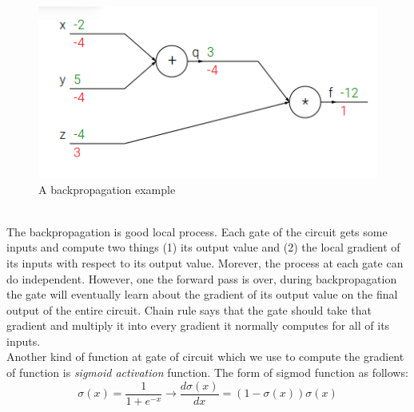 \begin{figure}[h]
	\centering
	\includegraphics[scale=0.6]{images/back_ex}
	\caption{A backpropagation example}
	\label{figbackex}
\end{figure}~\\[0.2cm]
The backpropagation is good local process. Each gate of the circuit gets some inputs and compute two things (1) its output value and (2) the local gradient of its inputs with respect to its output value. Morever, the process at each gate can do independent. However, one the forward pass is over, during backpropagation the gate will eventually learn about the gradient of its output value on the final output of the entire circuit. Chain rule says that the gate should take that gradient and multiply it into every gradient it normally computes for all of its inputs.\\[0.2cm]
Another kind of function at gate of circuit which we use to compute the gradient of function is \textit{sigmoid activation} function. The form of sigmod function as follows:
\begin{equation}
	\sigma(x) = \frac{1}{1 + e^{-x} }\rightarrow \frac{d\sigma(x)}{dx} = (1-\sigma(x))\sigma(x)
\end{equation}